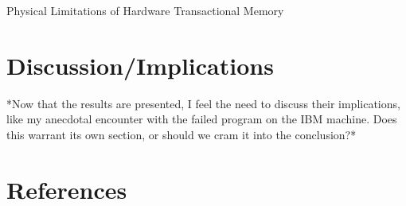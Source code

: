 \documentclass{article}
\begin{document}
\newcommand{\figuretitle}[1]{\textbf{#1}\\\vspace{2mm}}

\begin{center}
{\huge Physical Limitations of Hardware Transactional Memory}
\end{center}






\section{Discussion/Implications}
*Now that the results are presented, I feel the need to discuss their
implications, like my anecdotal encounter with the failed program on the IBM
machine. Does this warrant its own section, or should we cram it into the
conclusion?*




\section{References}
\end{document}
